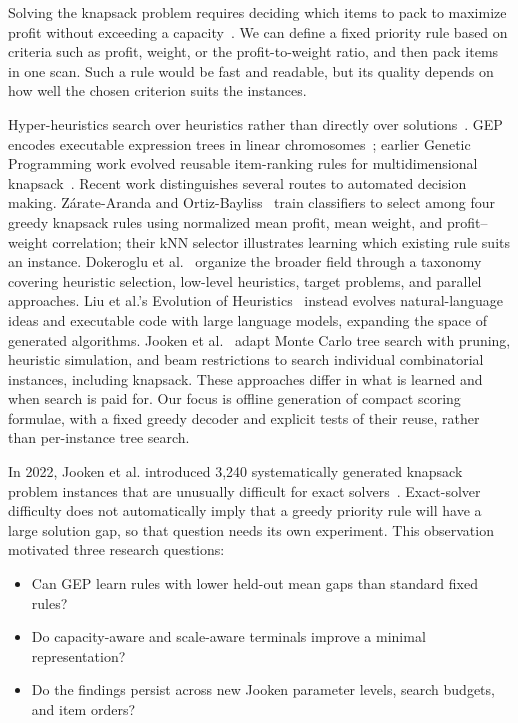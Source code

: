 \documentclass[conference]{IEEEtran}
\begin{document}
Solving the knapsack problem requires deciding which items to pack to maximize profit without exceeding a capacity~\cite{kellerer2004}. We can define a fixed priority rule based on criteria such as profit, weight, or the profit-to-weight ratio, and then pack items in one scan. Such a rule would be fast and readable, but its quality depends on how well the chosen criterion suits the instances.

Hyper-heuristics search over heuristics rather than directly over solutions~\cite{burke2013}. GEP encodes executable expression trees in linear chromosomes~\cite{ferreira2001}; earlier Genetic Programming work evolved reusable item-ranking rules for multidimensional knapsack~\cite{drake2014}. Recent work distinguishes several routes to automated decision making. Z\'arate-Aranda and Ortiz-Bayliss~\cite{zarate2025} train classifiers to select among four greedy knapsack rules using normalized mean profit, mean weight, and profit--weight correlation; their kNN selector illustrates learning which existing rule suits an instance. Dokeroglu et al.~\cite{dokeroglu2024} organize the broader field through a taxonomy covering heuristic selection, low-level heuristics, target problems, and parallel approaches. Liu et al.'s Evolution of Heuristics~\cite{liu2024eoh} instead evolves natural-language ideas and executable code with large language models, expanding the space of generated algorithms. Jooken et al.~\cite{jooken2023mcts} adapt Monte Carlo tree search with pruning, heuristic simulation, and beam restrictions to search individual combinatorial instances, including knapsack. These approaches differ in what is learned and when search is paid for. Our focus is offline generation of compact scoring formulae, with a fixed greedy decoder and explicit tests of their reuse, rather than per-instance tree search.

In 2022, Jooken et al. introduced 3,240 systematically generated knapsack problem instances that are unusually difficult for exact solvers~\cite{jooken2022}. Exact-solver difficulty does not automatically imply that a greedy priority rule will have a large solution gap, so that question needs its own experiment. This observation motivated three research questions: 

\begin{itemize}
    \item Can GEP learn rules with lower held-out mean gaps than standard fixed rules?
    \item Do capacity-aware and scale-aware terminals improve a minimal representation?
    \item Do the findings persist across new Jooken parameter levels, search budgets, and item orders?
\end{itemize}
\end{document}
